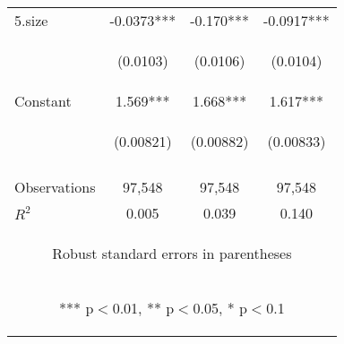 \documentclass[]{article}
\begin{document}
\begin{center}
\begin{tabular}{lccc}
5.size & -0.0373*** & -0.170*** & -0.0917*** \\
\vspace{4pt} & \begin{footnotesize}(0.0103)\end{footnotesize} & \begin{footnotesize}(0.0106)\end{footnotesize} & \begin{footnotesize}(0.0104)\end{footnotesize} \\
Constant & 1.569*** & 1.668*** & 1.617*** \\
 & \begin{footnotesize}(0.00821)\end{footnotesize} & \begin{footnotesize}(0.00882)\end{footnotesize} & \begin{footnotesize}(0.00833)\end{footnotesize} \\
\vspace{4pt} & \begin{footnotesize}\end{footnotesize} & \begin{footnotesize}\end{footnotesize} & \begin{footnotesize}\end{footnotesize} \\
Observations & 97,548 & 97,548 & 97,548 \\
 $R^2$ & 0.005 & 0.039 & 0.140 \\ \hline
\multicolumn{4}{c}{\begin{footnotesize} Robust standard errors in parentheses\end{footnotesize}} \\
\multicolumn{4}{c}{\begin{footnotesize} *** p$<$0.01, ** p$<$0.05, * p$<$0.1\end{footnotesize}} \\
\end{tabular}
\end{center}
\end{document}

